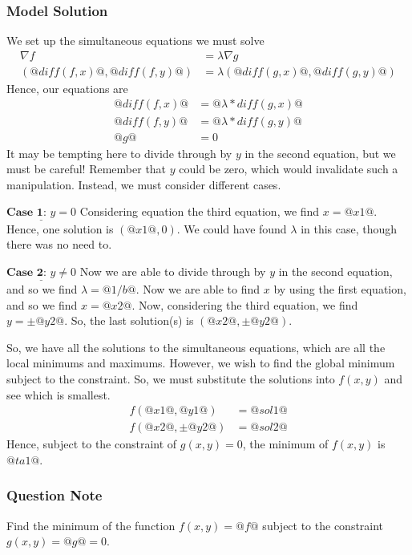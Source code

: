 \documentclass[a4paper,10pt]{article}
\begin{document}
\subsubsection{Model Solution}
We set up the simultaneous equations we must solve \begin{align*} \nabla f &= \lambda \nabla g \\ \left( @diff(f,x)@,  @diff(f,y)@ \right) &= \lambda \left( @diff(g,x)@,  @diff(g,y)@ \right) \end{align*} Hence, our equations are \begin{align*} @diff(f,x)@ &= @\lambda * diff(g,x)@ \\ @diff(f,y)@ &= @\lambda * diff(g,y)@ \\ @g@ &= 0 \end{align*} It may be tempting here to divide through by \(y\) in the second equation, but we must be careful! Remember that \(y\) could be zero, which would invalidate such a manipulation. Instead, we must consider different cases.

\(\underline{\textbf{Case 1: } y=0}\)
Considering equation the third equation, we find \(x=@x1@\). Hence, one solution is \(\left(@x1@,0\right)\). We could have found \(\lambda\) in this case, though there was no need to.

\(\underline{\textbf{Case 2: } y\neq0}\)
Now we are able to divide through by \(y\) in the second equation, and so we find \(\lambda = @1/b@\). Now we are able to find \(x\) by using the first equation, and so we find \(x = @x2@\). Now, considering the third equation, we find \(y = \pm @y2@ \). So, the last solution(s) is \(\left(@x2@,\pm @y2@\right)\).

So, we have all the solutions to the simultaneous equations, which are all the local minimums and maximums. However, we wish to find the global minimum subject to the constraint. So, we must substitute the solutions into \(f(x,y)\) and see which is smallest. \begin{align*} f\left(@x1@,@y1@\right) &= @sol1@ \\ f\left(@x2@,\pm @y2@\right) &= @sol2@ \end{align*} Hence, subject to the constraint of \(g(x,y)=0\), the minimum of \(f(x,y)\) is \(@ta1@\).
\subsubsection{Question Note}
Find the minimum of the function \(f(x,y) = @f@\) subject to the constraint \(g(x,y) = @g@ = 0\).
\end{document}
